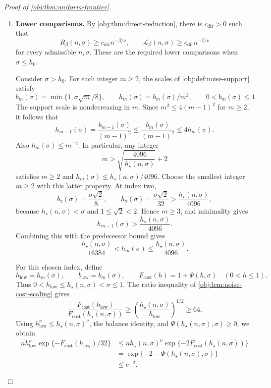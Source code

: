 \documentclass[11pt]{article}
\begin{document}
\begin{proof}[Proof of \cref{obj:thm:uniform-frontier}]
\begin{enumerate}
\item \textbf{Lower comparisons.}
By \cref{obj:thm:direct-reduction}, there is \(c_{\mathrm{dir}}>0\) such that
\[
R_\beta(n,\sigma)\ge c_{\mathrm{dir}}n^{-\beta/\nu},
\qquad
\mathcal L_\beta(n,\sigma)\ge c_{\mathrm{dir}}n^{-\beta/\nu}
\]
for every admissible \(n,\sigma\). These are the required lower comparisons when
\(\sigma\le h_0\).

Consider \(\sigma>h_0\). For each integer \(m\ge2\), the scales of
\cref{obj:def:noise-support} satisfy
\[
b_m(\sigma)=\min\{1,\sigma\sqrt m/8\},
\qquad
h_m(\sigma)=b_m(\sigma)/m^2,
\qquad
0<b_m(\sigma)\le1.
\]
The support scale is nondecreasing in \(m\). Since
\(m^2\le4(m-1)^2\) for \(m\ge2\), it follows that
\[
h_{m-1}(\sigma)
=\frac{b_{m-1}(\sigma)}{(m-1)^2}
\le\frac{b_m(\sigma)}{(m-1)^2}
\le4h_m(\sigma).
\]
Also \(h_m(\sigma)\le m^{-2}\). In particular, any integer
\[
m>\sqrt{\frac{4096}{h_\star(n,\sigma)}}+2
\]
satisfies \(m\ge2\) and \(h_m(\sigma)\le h_\star(n,\sigma)/4096\).
Choose the smallest integer \(m\ge2\) with this latter property. At index two,
\[
b_2(\sigma)=\frac{\sigma\sqrt2}{8},
\qquad
h_2(\sigma)=\frac{\sigma\sqrt2}{32}
>\frac{h_\star(n,\sigma)}{4096},
\]
because \(h_\star(n,\sigma)<\sigma\) and
\(1\le\sqrt2<2\). Hence \(m\ge3\), and minimality gives
\[
h_{m-1}(\sigma)>\frac{h_\star(n,\sigma)}{4096}.
\]
Combining this with the predecessor bound gives
\[
\frac{h_\star(n,\sigma)}{16384}
<h_m(\sigma)
\le\frac{h_\star(n,\sigma)}{4096}.
\]

For this chosen index, define
\[
h_{\mathrm{low}}=h_m(\sigma),\qquad
b_{\mathrm{low}}=b_m(\sigma),\qquad
F_{\mathrm{cost}}(h)=1+\Psi(h,\sigma)\quad(0<h\le1).
\]
Thus \(0<h_{\mathrm{low}}\le h_\star(n,\sigma)<\sigma\le1\).
The ratio inequality of \cref{obj:lem:noise-cost-scaling} gives
\[
\frac{F_{\mathrm{cost}}(h_{\mathrm{low}})}
     {F_{\mathrm{cost}}(h_\star(n,\sigma))}
\ge
\left(\frac{h_\star(n,\sigma)}{h_{\mathrm{low}}}\right)^{1/2}
\ge64.
\]
Using \(h_{\mathrm{low}}^\nu\le h_\star(n,\sigma)^\nu\), the balance identity, and
\(\Psi(h_\star(n,\sigma),\sigma)\ge0\), we obtain
\[
\begin{aligned}
n h_{\mathrm{low}}^\nu
 \exp\{-F_{\mathrm{cost}}(h_{\mathrm{low}})/32\}
&\le
n h_\star(n,\sigma)^\nu
 \exp\{-2F_{\mathrm{cost}}(h_\star(n,\sigma))\}\\
&=\exp\{-2-\Psi(h_\star(n,\sigma),\sigma)\}\\
&\le e^{-2}.
\end{aligned}
\]


\end{enumerate}
\end{proof}
\end{document}
